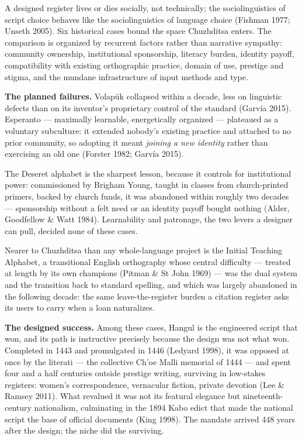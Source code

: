 \documentclass[12pt]{article}
\begin{document}
A designed register lives or dies socially, not technically; the sociolinguistics of script choice behaves like the sociolinguistics of language choice (Fishman 1977; Unseth 2005). Six historical cases bound the space Chuzhditsa enters. The comparison is organized by recurrent factors rather than narrative sympathy: community ownership, institutional sponsorship, literacy burden, identity payoff, compatibility with existing orthographic practice, domain of use, prestige and stigma, and the mundane infrastructure of input methods and type.

\textbf{The planned failures.} Volap\"uk collapsed within a decade, less on linguistic defects than on its inventor's proprietary control of the standard (Garv\'ia 2015). Esperanto — maximally learnable, energetically organized — plateaued as a voluntary subculture: it extended nobody's existing practice and attached to no prior community, so adopting it meant \emph{joining a new identity} rather than exercising an old one (Forster 1982; Garv\'ia 2015).

The Deseret alphabet is the sharpest lesson, because it controls for institutional power: commissioned by Brigham Young, taught in classes from church-printed primers, backed by church funds, it was abandoned within roughly two decades — sponsorship without a felt need or an identity payoff bought nothing (Alder, Goodfellow \& Watt 1984). Learnability and patronage, the two levers a designer can pull, decided none of these cases.

Nearer to Chuzhditsa than any whole-language project is the Initial Teaching Alphabet, a transitional English orthography whose central difficulty — treated at length by its own champions (Pitman \& St John 1969) — was the dual system and the transition back to standard spelling, and which was largely abandoned in the following decade: the same leave-the-register burden a citation register asks its users to carry when a loan naturalizes.

\textbf{The designed success.} Among these cases, Hangul is the engineered script that won, and its path is instructive precisely because the design was not what won. Completed in 1443 and promulgated in 1446 (Ledyard 1998), it was opposed at once by the literati — the collective Ch'oe Malli memorial of 1444 — and spent four and a half centuries outside prestige writing, surviving in low-stakes registers: women's correspondence, vernacular fiction, private devotion (Lee \& Ramsey 2011). What revalued it was not its featural elegance but nineteenth-century nationalism, culminating in the 1894 Kabo edict that made the national script the base of official documents (King 1998). The mandate arrived 448 years after the design; the niche did the surviving.
\end{document}
